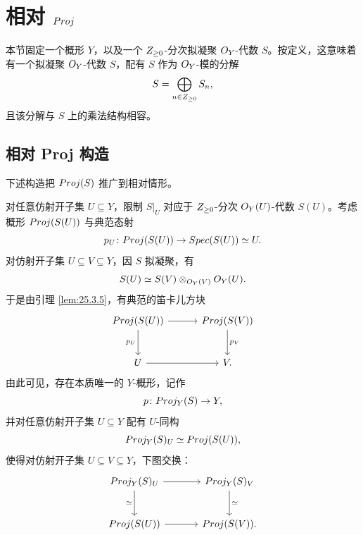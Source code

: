 
\providecommand{\QCoh}{\mathsf{QCoh}}
\providecommand{\Sym}{\operatorname{Sym}}

\section{相对 $Proj$}\label{sec:27}

本节固定一个概形 $Y$，以及一个 $Z_{\ge 0}$-分次拟凝聚 $O_Y$-代数 $S$。按定义，这意味着有一个拟凝聚 $O_Y$-代数 $S$，配有 $S$ 作为 $O_Y$-模的分解
\[
S = \bigoplus_{n \in Z_{\ge 0}} S_n,
\]
且该分解与 $S$ 上的乘法结构相容。

\subsection{相对 Proj 构造}\label{sec:27.1}

下述构造把 $Proj(S)$ 推广到相对情形。

\begin{construction}\label{con:27.1.1}
对任意仿射开子集 $U \subseteq Y$，限制 $S|_U$ 对应于 $Z_{\ge 0}$-分次 $O_Y(U)$-代数 $S(U)$。考虑概形 $Proj(S(U))$ 与典范态射
\[
p_U \colon Proj(S(U)) \to Spec(S(U)) \simeq U.
\]
对仿射开子集 $U \subseteq V \subseteq Y$，因 $S$ 拟凝聚，有
\[
S(U) \simeq S(V) \otimes_{O_Y(V)} O_Y(U).
\]
于是由引理 \ref{lem:25.3.5}，有典范的笛卡儿方块
\[
\begin{tikzcd}[column sep=3em, row sep=2.6em]
\Proj(S(U)) \arrow[r] \arrow[d, "p_U"'] & \Proj(S(V)) \arrow[d, "p_V"] \\
U \arrow[r] & V.
\end{tikzcd}
\]
由此可见，存在本质唯一的 $Y$-概形，记作
\[
p \colon Proj_Y(S) \to Y,
\]
并对任意仿射开子集 $U \subseteq Y$ 配有 $U$-同构
\[
Proj_Y(S)_U \simeq Proj(S(U)),
\]
使得对仿射开子集 $U \subseteq V \subseteq Y$，下图交换：
\[
\begin{tikzcd}[column sep=3.4em, row sep=2.6em]
\Proj_Y(S)_U \arrow[r] \arrow[d, "\simeq"'] & \Proj_Y(S)_V \arrow[d, "\simeq"] \\
\Proj(S(U)) \arrow[r] & \Proj(S(V)).
\end{tikzcd}
\]
\end{construction}

